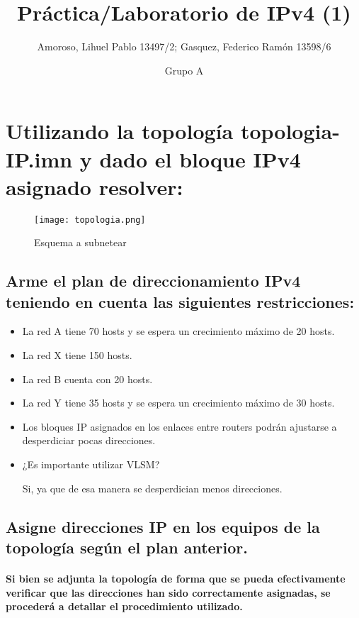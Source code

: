 \documentclass[11pt]{article} %
\title{Práctica/Laboratorio de IPv4 (1)}
\author{Amoroso, Lihuel Pablo 13497/2; Gasquez, Federico Ramón 13598/6}
\date{Grupo A} %
\begin{document}
    \maketitle

    \section{Utilizando la topología topologia-IP.imn y dado el bloque IPv4 asignado resolver:}

    \begin{figure}[htbp]
        \centering
        \texttt{[image: topologia.png]}
        \caption{Esquema a subnetear}
        \label{fig:topologia}
    \end{figure}

        \subsection{Arme el plan de direccionamiento IPv4 teniendo en cuenta las siguientes restricciones:}
        \begin{itemize}
            \item La red A tiene 70 hosts y se espera un crecimiento máximo de 20 hosts.
            \item La red X tiene 150 hosts.
            \item La red B cuenta con 20 hosts.
            \item La red Y tiene 35 hosts y se espera un crecimiento máximo de 30 hosts.
            \item Los bloques IP asignados en los enlaces entre routers podrán ajustarse a desperdiciar pocas direcciones.
            \item ¿Es importante utilizar VLSM?

                Si, ya que de esa manera se desperdician menos direcciones.
        \end{itemize}

        \subsection{Asigne direcciones IP en los equipos de la topología según el plan anterior.}
        
        \paragraph{Si bien se adjunta la topología de forma que se pueda efectivamente verificar que las direcciones han sido correctamente asignadas, se procederá a detallar el procedimiento utilizado.}
\end{document}
